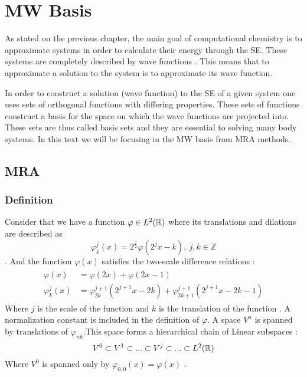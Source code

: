 \documentclass[../master_thesis.tex]{subfiles}
\begin{document}
\chapter{\ac{MW} Basis}
As stated on the previous chapter, the main goal of computational chemistry is
to approximate systems in order to calculate their energy through the \ac{SE}. %
These systems are completely described by wave functions \cite{Cohen:1973}.
This means that to approximate a solution to the system is to approximate its
wave function.

In order to construct a solution (wave function) to the \ac{SE} of a given
system one uses sets of orthogonal functions with differing properties. These
sets of functions construct a basis for the space on which the wave functions
are projected into. These sets are thus called basis sets \cite{Cramer:2004}
and they are essential to solving many body systems. In this text we will be
focusing in the \ac{MW} basis from \ac{MRA} methods.

\section{\ac{MRA}}
\subsection{Definition}
Consider that we have a function $\varphi \in L^2(\mathbb{R})$ where its translations
and dilations are described as \cite{Schneider:2007}
\begin{equation}
  \varphi^j_k(x) = 2^{\frac{j}{2}}\varphi(2^jx - k),\  j,k \in \mathbb{Z}
\end{equation}.
And the function $\varphi(x)$ satisfies the two-scale difference relations \cite{Beylkin:MRA, Schneider:2007, Sorland}:
\begin{align}
  \begin{split}
    \varphi(x) &= \varphi(2x) + \varphi(2x - 1)\\
    \varphi^j_k(x) &= \varphi^{j+1}_{2k}(2^{j+1}x - 2k) + \varphi^{j+1}_{2k+1}(2^{j+1}x - 2k - 1)
  \end{split}
\end{align}
Where $j$ is the scale of the function and $k$ is the translation of the function
\cite{Sorland}. A normalization constant is included in the definition of $\varphi$.
A space $V^n$ is spanned by translations of $\varphi_{nk}$.This space forms a
hierarchical chain of Linear
subspaces \cite{Beylkin:MRA}:
\begin{equation}
  V^0 \subset V^1 \subset ... \subset V^j \subset ... \subset L^2(\mathbb{R})\label{eq:seqsubspace}
\end{equation}
Where $V^0$ is spanned only by $\varphi_{0,0}(x)=\varphi(x)$ \cite{Sorland}.
\end{document}
